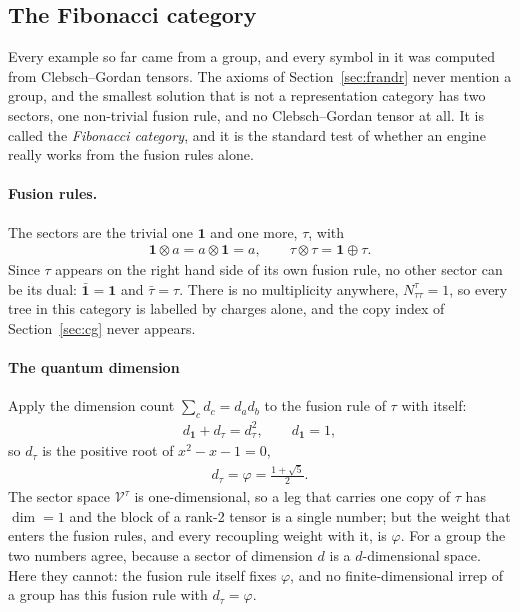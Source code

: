 \subsection{The Fibonacci category}
\label{sec:fibonacci}

Every example so far came from a group, and every symbol in it was computed from Clebsch--Gordan tensors. The axioms of Section~\ref{sec:frandr} never mention a group, and the smallest solution that is not a representation category has two sectors, one non-trivial fusion rule, and no Clebsch--Gordan tensor at all. It is called the \emph{Fibonacci category}, and it is the standard test of whether an engine really works from the fusion rules alone.

\paragraph{Fusion rules.} The sectors are the trivial one $\mathbf 1$ and one more,
$\tau$, with
\begin{align}
\mathbf 1\otimes a=a\otimes\mathbf 1=a,\qquad \tau\otimes\tau=\mathbf 1\oplus\tau .
\end{align}
Since $\tau$ appears on the right hand side of its own fusion rule, no other sector can
be its dual: $\bar{\mathbf 1}=\mathbf 1$ and $\bar\tau=\tau$. There is no multiplicity
anywhere, $N^{\tau}_{\tau\tau}=1$, so every tree in this category is labelled by charges
alone, and the copy index of Section~\ref{sec:cg} never appears.

\paragraph{The quantum dimension} Apply the dimension count
$\sum_c d_c=d_ad_b$ to the fusion rule of $\tau$ with itself:
\begin{align}
d_{\mathbf 1}+d_\tau=d_\tau^2,\qquad d_{\mathbf 1}=1,
\end{align}
so $d_\tau$ is the positive root of $x^2-x-1=0$,
\begin{align}
d_\tau=\varphi=\frac{1+\sqrt5}{2}.
\end{align}
The sector space $\mathscr V^\tau$ is one-dimensional, so a leg that carries one copy of $\tau$ has $\dim=1$ and the block of a rank-2 tensor is a single number; but the weight that
enters the fusion rules, and every recoupling weight with it, is $\varphi$. For a group
the two numbers agree, because a sector of dimension $d$ is a $d$-dimensional space.
Here they cannot: the fusion rule itself fixes $\varphi$, and no finite-dimensional
irrep of a group has this fusion rule with $d_\tau=\varphi$.

